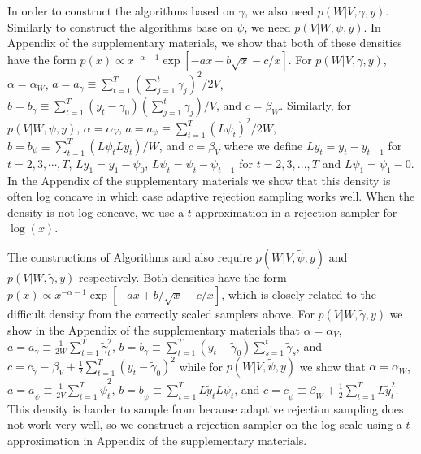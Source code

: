 \documentclass[12pt]{article}
\begin{document}
In order to construct the algorithms based on $\gamma$, we also need $p(W|V,\gamma,y)$. Similarly to construct the algorithms base on $\psi$, we need $p(V|W,\psi,y)$. In Appendix  of the supplementary materials, we show that both of these densities have the form $p(x)\propto x^{-\alpha-1}\exp\left[ -ax + b\sqrt{x} -c/x\right]$. For $p(W|V,\gamma,y)$, $\alpha=\alpha_W$, $a=a_\gamma \equiv \sum_{t=1}^T(\sum_{j=1}^t\gamma_j)^2/2V$, $b=b_\gamma \equiv\sum_{t=1}^T(y_t-\gamma_0)(\sum_{j=1}^t\gamma_j)/V$, and $c=\beta_W$. Similarly, for $p(V|W,\psi,y)$, $\alpha=\alpha_V$, $a=a_{\psi}\equiv\sum_{t=1}^T(L\psi_t)^2/2W$, $b=b_{\psi}\equiv\sum_{t=1}^T(L\psi_tLy_t)/W$, and $c=\beta_V$ where we define $Ly_t=y_t-y_{t-1}$ for $t=2,3,\cdots,T$, $Ly_1=y_1 - \psi_0$, $L\psi_t = \psi_t - \psi_{t-1}$ for $t=2,3,...,T$ and $L\psi_1=\psi_1-0$. In the Appendix  of the supplementary materials we show that this density is often log concave in which case adaptive rejection sampling \cite{gilks1992adaptive} works well. When the density is not log concave, we use a $t$ approximation in a rejection sampler for $\log(x)$.

The constructions of Algorithms  and  also require $p(W|V,\tilde{\psi},y)$ and $p(V|W,\tilde{\gamma},y)$ respectively. Both densities have the form $p(x)\propto x^{-\alpha-1}\exp\left[ -ax + b/\sqrt{x} -c/x\right]$, which is closely related to the difficult density from the correctly scaled samplers above.  For $p(V|W,\tilde{\gamma},y)$ we show in the Appendix  of the supplementary materials that $\alpha=\alpha_V$, $a = a_{\tilde{\gamma}}\equiv\frac{1}{2W}\sum_{t=1}^T\tilde{\gamma}_t^2$, $b =b_{\tilde{\gamma}}\equiv \sum_{t=1}^T(y_t - \tilde{\gamma}_0)\sum_{s=1}^t\tilde{\gamma}_s$, and $c =c_{\tilde{\gamma}}\equiv \beta_V + \frac{1}{2}\sum_{t=1}^T(y_t - \tilde{\gamma}_0)^2$ while for $p(W|V,\tilde{\psi},y)$ we show that $\alpha=\alpha_W$,   $a =a_{\tilde{\psi}}\equiv \frac{1}{2V}\sum_{t=1}^T\tilde{\psi}_t^2$,  $b =b_{\tilde{\psi}}\equiv \sum_{t=1}^TL\tilde{y}_tL\tilde{\psi}_t$, and $c =c_{\tilde{\psi}}\equiv \beta_W + \frac{1}{2}\sum_{t=1}^TL\tilde{y}_t^2$. This density is harder to sample from because adaptive rejection sampling does not work very well, so we construct a rejection sampler on the log scale using a $t$ approximation in Appendix  of the supplementary materials.

\end{document}
